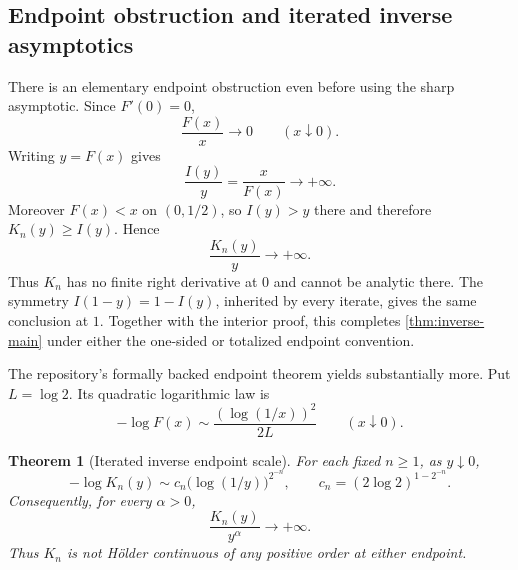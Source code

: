 \documentclass[11pt,oneside]{article}
\newtheorem{theorem}{Theorem}[section]
\theoremstyle{definition}
\theoremstyle{remark}
\begin{document}
\subsection{Endpoint obstruction and iterated inverse asymptotics}
\label{sec:endpoint-inverse}

There is an elementary endpoint obstruction even before using the sharp asymptotic.
Since $F'(0)=0$,
\begin{equation}
 \frac{F(x)}{x}\longrightarrow0\qquad(x\downarrow0).
 \label{eq:F-over-x-zero}
\end{equation}
Writing $y=F(x)$ gives
\begin{equation}
 \frac{I(y)}{y}=\frac{x}{F(x)}\longrightarrow+\infty.
 \label{eq:I-over-y-infinite}
\end{equation}
Moreover $F(x)<x$ on $(0,1/2)$, so $I(y)>y$ there and therefore
$K_n(y)\geq I(y)$.  Hence
\begin{equation}
 \frac{K_n(y)}{y}\longrightarrow+\infty.
 \label{eq:Kn-no-derivative}
\end{equation}
Thus $K_n$ has no finite right derivative at $0$ and cannot be analytic there.
The symmetry $I(1-y)=1-I(y)$, inherited by every iterate, gives the same conclusion at
$1$.  Together with the interior proof, this completes \cref{thm:inverse-main} under
either the one-sided or totalized endpoint convention.

The repository's formally backed endpoint theorem yields substantially more.  Put
$L=\log2$.  Its quadratic logarithmic law is
\begin{equation}
 -\log F(x)\sim\frac{(\log(1/x))^2}{2L}
 \qquad(x\downarrow0).
 \label{eq:quadratic-endpoint-law}
\end{equation}

\begin{theorem}[Iterated inverse endpoint scale]
\label{thm:iterated-endpoint}
For each fixed $n\geq1$, as $y\downarrow0$,
\begin{equation}
 -\log K_n(y)
 \sim c_n\bigl(\log(1/y)\bigr)^{2^{-n}},
 \qquad
 c_n=(2\log2)^{1-2^{-n}}.
 \label{eq:iterated-inverse-endpoint}
\end{equation}
Consequently, for every $\alpha>0$,
\begin{equation}
 \frac{K_n(y)}{y^\alpha}\longrightarrow+\infty.
 \label{eq:not-holder}
\end{equation}
Thus $K_n$ is not H\"older continuous of any positive order at either endpoint.
\end{theorem}
\end{document}
